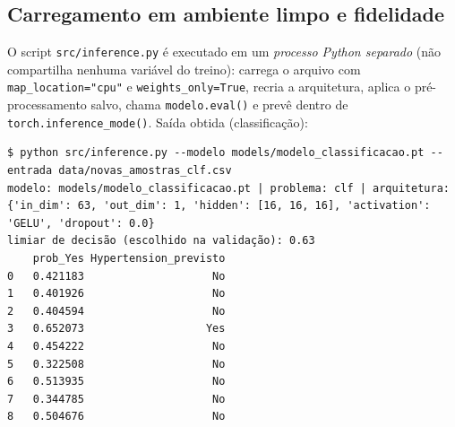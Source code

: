 \documentclass[11pt,a4paper]{article}
\begin{document}
\subsection{Carregamento em ambiente limpo e fidelidade}
O script \texttt{src/inference.py} é executado em um \emph{processo Python separado} (não compartilha nenhuma variável do treino):
carrega o arquivo com \texttt{map\_location="cpu"} e \texttt{weights\_only=True}, recria a arquitetura, aplica o pré-processamento
salvo, chama \texttt{modelo.eval()} e prevê dentro de \texttt{torch.inference\_mode()}. Saída obtida (classificação):
\begin{verbatim}
$ python src/inference.py --modelo models/modelo_classificacao.pt --entrada data/novas_amostras_clf.csv
modelo: models/modelo_classificacao.pt | problema: clf | arquitetura: {'in_dim': 63, 'out_dim': 1, 'hidden': [16, 16, 16], 'activation': 'GELU', 'dropout': 0.0}
limiar de decisão (escolhido na validação): 0.63
    prob_Yes Hypertension_previsto
0   0.421183                    No
1   0.401926                    No
2   0.404594                    No
3   0.652073                   Yes
4   0.454222                    No
5   0.322508                    No
6   0.513935                    No
7   0.344785                    No
8   0.504676                    No
\end{verbatim}
\begin{table}[H]\centering\scriptsize{}
\caption{Verificação de fidelidade no teste: saídas do modelo em memória $\times$ modelo carregado do .pt (métrica principal).}\label{tab:fid}\end{table}
\end{document}
